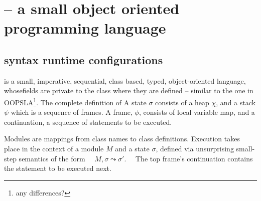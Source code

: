  \newcommand{\atom}{atom\xspace}
 \newcommand{\atoms}{atoms\xspace}  
 \newcommand{\pushSymbol}{\bigtriangledown} %
  \newcommand{\popSymbol}{\bigtriangleup} %
\newcommand{\Pushes}[3] {\ensuremath{ #1,   \overline{#2} \pushSymbol  #3}}
\newcommand{\Pop}[2] {\ensuremath{ #1 \popSymbol  #2}}
\newcommand{\va}{\ensuremath{\upsilon}}
\newcommand{\PushA}[4] {\ensuremath{  #1 \vdash #2, {\overline{#3}} \pushSymbol  #4  }}
\newcommand{\PopA}[3]{  #1 \vdash #2 \popSymbol #3}


 
\section{\LangOO -- a small  object oriented programming language}

\subsection{\LangOO syntax runtime configurations}
\label{sub:Loo} 
 \LangOO  is a {small}, imperative, sequential,  class based, typed, object-oriented language, whosefields are private to the class where they are defined -- similar to the one in OOPSLA\footnote{any differences?}.
The complete definition of 
A \LangOO state $\sigma$ consists of a  heap $\chi$, and a  {stack $\psi$ which is a sequence of frames}.
A frame, $\phi$, consists of local variable map, and a continuation, \ie a sequence of statements to be executed.
 
Modules are mappings from class names to class definitions. 
Execution takes place in the context of  a module $M$ and   a state $\sigma$, defined via unsurprising small-step semantics of the form \ \ 
   $M, \sigma \leadsto \sigma'$. \ \
The   top frame's continuation contains the statement to be  executed next.  



